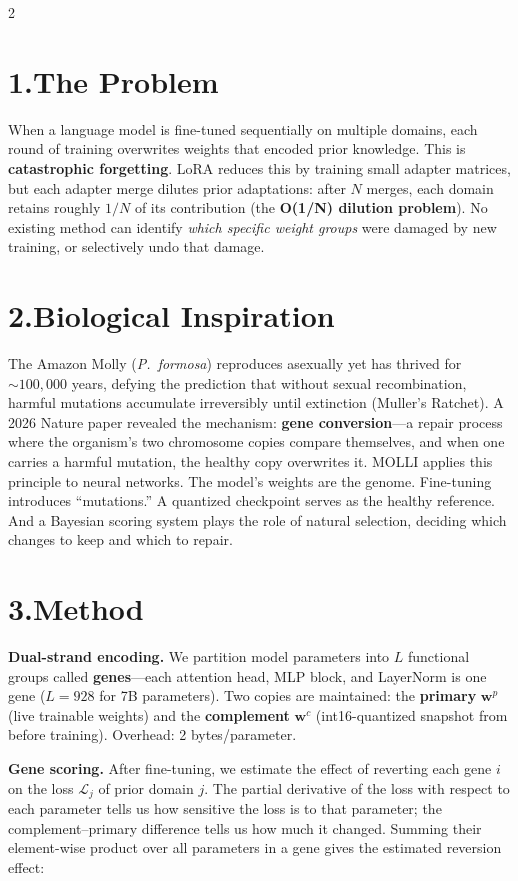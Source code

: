 \documentclass[9pt,letterpaper]{article}
\begin{document}
\begin{multicols}{2}

\section{1.\;The Problem}
When a language model is fine-tuned sequentially on multiple domains, each round of training overwrites weights that encoded prior knowledge. This is \textbf{catastrophic forgetting}. LoRA reduces this by training small adapter matrices, but each adapter merge dilutes prior adaptations: after $N$ merges, each domain retains roughly $1/N$ of its contribution (the \textbf{O(1/N) dilution problem}). No existing method can identify \emph{which specific weight groups} were damaged by new training, or selectively undo that damage.

\section{2.\;Biological Inspiration}
The Amazon Molly (\textit{P.~formosa}) reproduces asexually yet has thrived for ${\sim}100{,}000$ years, defying the prediction that without sexual recombination, harmful mutations accumulate irreversibly until extinction (Muller's Ratchet). A 2026 Nature paper revealed the mechanism: \textbf{gene conversion}---a repair process where the organism's two chromosome copies compare themselves, and when one carries a harmful mutation, the healthy copy overwrites it. MOLLI applies this principle to neural networks. The model's weights are the genome. Fine-tuning introduces ``mutations.'' A quantized checkpoint serves as the healthy reference. And a Bayesian scoring system plays the role of natural selection, deciding which changes to keep and which to repair.

\section{3.\;Method}

\textbf{Dual-strand encoding.}
We partition model parameters into $L$ functional groups called \textbf{genes}---each attention head, MLP block, and LayerNorm is one gene ($L\!=\!928$ for 7B parameters). Two copies are maintained: the \textbf{primary} $\mathbf{w}^p$ (live trainable weights) and the \textbf{complement} $\mathbf{w}^c$ (int16-quantized snapshot from before training). Overhead: 2 bytes/parameter.

\textbf{Gene scoring.}
After fine-tuning, we estimate the effect of reverting each gene $i$ on the loss $\mathcal{L}_j$ of prior domain $j$. The partial derivative of the loss with respect to each parameter tells us how sensitive the loss is to that parameter; the complement--primary difference tells us how much it changed. Summing their element-wise product over all parameters in a gene gives the estimated reversion effect:


\end{multicols}
\end{document}
